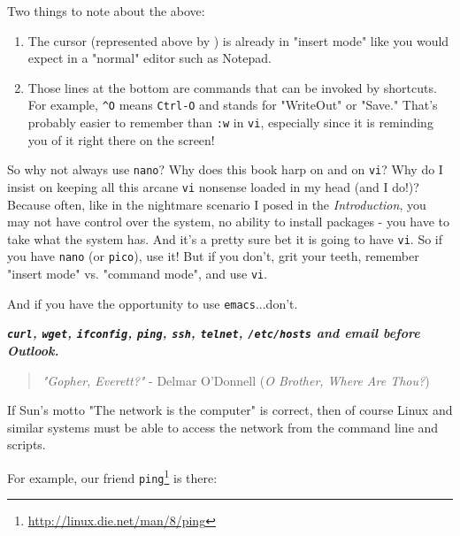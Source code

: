 \documentclass[10pt,]{book}
\renewcommand{\href}[2]{#2\footnote{\url{#1}}}
\numberwithin{figure}{chapter}
\DeclareRobustCommand{\drcmd}[1]{\index{Commands!#1}}
\begin{document}
Two things to note about the above:

\begin{enumerate}
\def\labelenumi{\arabic{enumi}.}
\item
  The cursor (represented above by \texttt{\textbar{}}) is already in
  "insert mode" like you would expect in a "normal" editor such as
  Notepad.
\item
  Those lines at the bottom are commands that can be invoked by
  shortcuts. For example, \texttt{\^{}O} means \texttt{Ctrl-O} and
  stands for "WriteOut" or "Save." That's probably easier to remember
  than \texttt{:w} in \texttt{vi}, especially since it is reminding you
  of it right there on the screen!
\end{enumerate}

So why not always use \texttt{nano}? Why does this book harp on and on
\texttt{vi}? Why do I insist on keeping all this arcane \texttt{vi}
nonsense loaded in my head (and I do!)? Because often, like in the
nightmare scenario I posed in the \emph{Introduction}, you may not have
control over the system, no ability to install packages - you have to
take what the system has. And it's a pretty sure bet it is going to have
\texttt{vi}. So if you have \texttt{nano} (or \texttt{pico}), use it!
But if you don't, grit your teeth, remember "insert mode" vs. "command
mode", and use \texttt{vi}.

And if you have the opportunity to use \texttt{emacs}...don't.


\textbf{\emph{\texttt{curl}, \texttt{wget}, \texttt{ifconfig},
\texttt{ping}, \texttt{ssh}, \texttt{telnet}, \texttt{/etc/hosts} and
email before Outlook.}}

\begin{quote}
\emph{"Gopher, Everett?"} - Delmar O'Donnell (\emph{O Brother, Where Are
Thou?})
\end{quote}

If Sun's motto "The network is the computer" is correct, then of course
Linux and similar systems must be able to access the network from the
command line and scripts.

For example, our friend
\href{http://linux.die.net/man/8/ping}{\texttt{ping}}\drcmd{ping} is
there:
\end{document}
